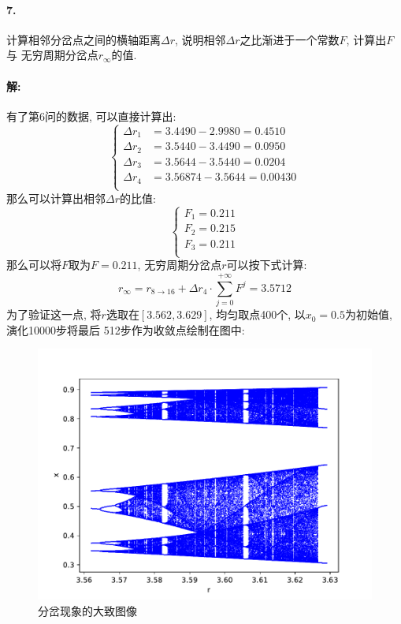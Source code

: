 \documentclass[a4paper,zihao=5,UTF8]{ctexart}
\begin{document}
    \paragraph{7.}
    计算相邻分岔点之间的横轴距离$\Delta r$, 说明相邻$\Delta r$之比渐进于一个常数$F$, 计算出$F$与
    无穷周期分岔点$r_{\infty}$的值.
    \paragraph{解:}
    有了第6问的数据, 可以直接计算出:
    \begin{equation}
        \left\{
        \begin{aligned}
            \Delta r_{1} &= 3.4490 - 2.9980 = 0.4510\\
            \Delta r_{2} &= 3.5440 - 3.4490 = 0.0950\\
            \Delta r_{3} &= 3.5644 - 3.5440 = 0.0204\\
            \Delta r_{4} &= 3.56874 - 3.5644 = 0.00430\\
        \end{aligned}
        \right.
    \end{equation}
    那么可以计算出相邻$\Delta r$的比值:
    \begin{equation}
        \left\{
        \begin{aligned}
            F_1 = 0.211\\
            F_2 = 0.215 \\
            F_3 = 0.211 \\
        \end{aligned}
        \right.
    \end{equation}
    那么可以将$F$取为$F=0.211$, 无穷周期分岔点$r$可以按下式计算:
    \begin{equation}
        r_\infty = r_{8\rightarrow 16} + \Delta r_{4}\cdot\sum_{j=0}^{+\infty}F^j = 3.5712
    \end{equation}
    为了验证这一点, 将$r$选取在$[3.562, 3.629]$, 均匀取点400个, 以$x_0 = 0.5$为初始值, 演化10000步将最后
    512步作为收敛点绘制在图中:
    \begin{figure}[htbp]
        \centering
        \includegraphics[scale=0.5]{6_another.pdf}
        \caption{分岔现象的大致图像}
    \end{figure}
\end{document}
